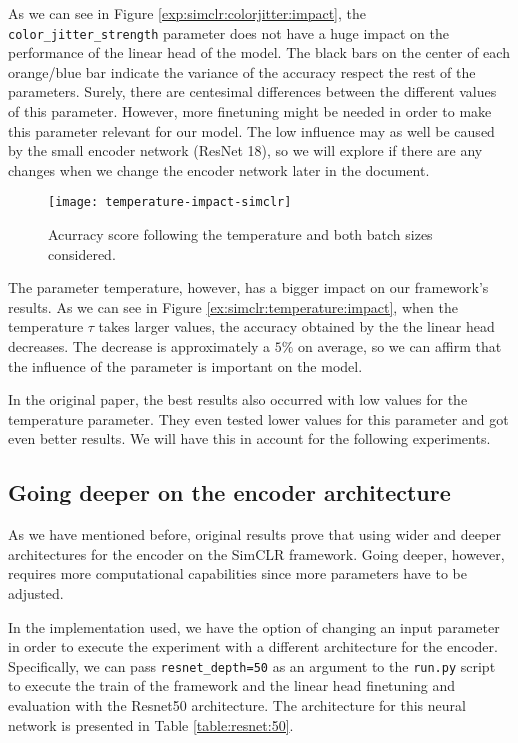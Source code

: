 As we can see in Figure \ref{exp:simclr:colorjitter:impact}, the \lstinline{color_jitter_strength} parameter does not have a huge impact on the performance of the linear head of the model. The black bars on the center of each orange/blue bar indicate the variance of the accuracy respect the rest of the parameters. Surely, there are centesimal differences between the different values of this parameter. However, more finetuning might be needed in order to make this parameter relevant for our model. The low influence may as well be caused by the small encoder network (ResNet 18), so we will explore if there are any changes when we change the encoder network later in the document.

\begin{figure}[H] 
    \centering
        \texttt{[image: temperature-impact-simclr]}%
       
        \caption{Acurracy score following the temperature and both batch sizes considered.}
        
    \label{exp:simclr:temperature:impact}
\end{figure}

The parameter temperature, however, has a bigger impact on our framework's results. As we can see in Figure \ref{ex:simclr:temperature:impact}, when the temperature $\tau$ takes larger values, the accuracy obtained by the the linear head decreases. The decrease is approximately a $5\%$ on average, so we can affirm that the influence of the parameter is important on the model.

In the original paper, the best results also occurred with low values for the temperature parameter. They even tested lower values for this parameter and got even better results. We will have this in account for the following experiments.

\subsection{Going deeper on the encoder architecture}
\label{experiments:simclr:second}


As we have mentioned before, original results prove that using wider and deeper architectures for the encoder on the SimCLR framework. Going deeper, however, requires more computational capabilities since more parameters have to be adjusted.

In the implementation used, we have the option of changing an input parameter in order to execute the experiment with a different architecture for the encoder. Specifically, we can pass \lstinline{resnet_depth=50} as an argument to the \lstinline{run.py} script to execute the train of the framework and the linear head finetuning and evaluation with the Resnet50 architecture. The architecture for this neural network is presented in Table \ref{table:resnet:50}.


